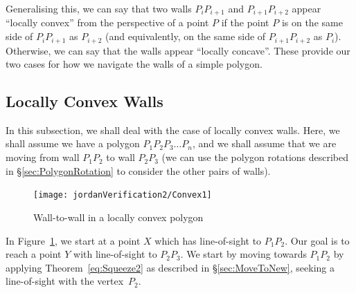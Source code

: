 Generalising this, we can say that two walls $P_{i}P_{i+1}$ and $P_{i+1}P_{i+2}$ appear ``locally convex'' from the perspective of a point $P$ if the point $P$ is on the same side of $P_{i}P_{i+1}$ as $P_{i+2}$ (and equivalently, on the same side of $P_{i+1}P_{i+2}$ as $P_{i}$). Otherwise, we can say that the walls appear ``locally concave''. These provide our two cases for how we navigate the walls of a simple polygon.

\subsection{Locally Convex Walls}\label{sec:ConcaveMove}
In this subsection, we shall deal with the case of locally convex walls. Here, we shall assume we have a polygon $P_1P_2P_3\ldots P_n$, and we shall assume that we are moving from wall $P_1P_2$ to wall $P_2P_3$ (we can use the polygon rotations described in \S\ref{sec:PolygonRotation} to consider the other pairs of walls).

\begin{figure}
\centering\texttt{[image: jordanVerification2/Convex1]}
\caption{Wall-to-wall in a locally convex polygon}
\label{fig:Convex1}
\end{figure}

In Figure~\ref{fig:Convex1}, we start at a point $X$ which has line-of-sight to $P_1P_2$. Our goal is to reach a point $Y$ with line-of-sight to $P_2P_3$. We start by moving towards $P_1P_2$ by applying Theorem~\ref{eq:Squeeze2} as described in \S\ref{sec:MoveToNew}, seeking a line-of-sight with the vertex~$P_2$. 



